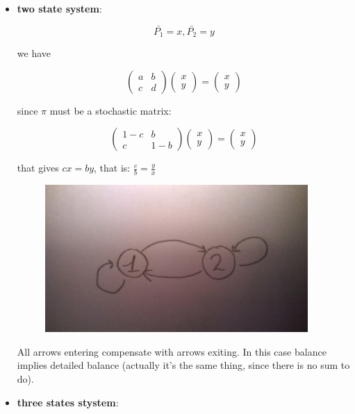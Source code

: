 \documentclass[a4paper, italian, openany]{book}
\begin{document}
\begin{itemize}
\item \textbf{two state system}:

$$\bar{P_1} = x, \bar{P_2} = y$$

we have

$$\left ( \begin{array}{cc} a & b \\ c & d \end{array} \right ) \left ( \begin{array}{c} x\\ y \end{array} \right ) = \left ( \begin{array}{c} x\\ y \end{array} \right )$$

since $\pi$ must be a stochastic matrix:

$$\left ( \begin{array}{cc} 1-c & b \\ c & 1-b \end{array} \right ) \left ( \begin{array}{c} x\\ y \end{array} \right ) = \left ( \begin{array}{c} x\\ y \end{array} \right )$$

that gives $cx = by$, that is: $\frac{c}{b}=\frac{y}{x}$

\begin{figure}[H]
\centering
\includegraphics[width=100mm]{img/pic13.jpg}
\end{figure}

All arrows entering compensate with arrows exiting. In this case balance implies detailed balance (actually it's the same thing, since there is no sum to do).

\item \textbf{three states stystem}:


\end{itemize}
\end{document}
